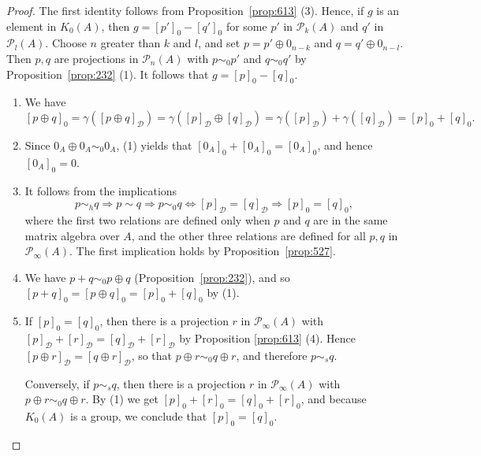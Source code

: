 \documentclass{book}
\begin{document}
\begin{proof}
  The first identity follows from Proposition~\ref{prop:613} (3). Hence, if \(g\) is an element
  in \(K_0(A)\), then \(g={[p']}_0-{[q']}_0\) for some \(p'\) in \(\mathcal{P}_k(A)\) and \(q'\) in \(\mathcal{P}_l(A)\).
  Choose \(n\) greater than \(k\) and \(l\), and set \(p=p'\oplus 0_{n-k}\) and \(q=q'\oplus 0_{n-l}\).
  Then \(p, q\) are projections in \(\mathcal{P}_n(A)\) with \(p\sim_0 p'\) and \(q\sim_0 q'\) by Proposition~\ref{prop:232} (1).
  It follows that \(g={[p]}_0-{[q]}_0\).
  \begin{enumerate}
    \item We have
    \[
      {[p\oplus q]}_0=\gamma({[p\oplus q]}_\mathcal{D})=\gamma({[p]}_\mathcal{D}\oplus {[q]}_\mathcal{D})=\gamma({[p]}_\mathcal{D})+ \gamma({[q]}_\mathcal{D})={[p]}_0+{[q]}_0.
    \]
    \item Since \(0_A\oplus 0_A\sim_0 0_A\), (1) yields that \({[0_A]}_0+{[0_A]}_0={[0_A]}_0\), and hence \({[0_A]}_0=0\).
    \item It follows from the implications
    \[
      p\sim_h q\Rightarrow p\sim q\Rightarrow p\sim_0 q \Leftrightarrow {[p]}_\mathcal{D}={[q]}_\mathcal{D}\Rightarrow {[p]}_0={[q]}_0,
    \]
    where the first two relations are defined only when \(p\) and \(q\) are in the same matrix algebra over \(A\), and the other three relations are defined for all \(p, q\) in \(\mathcal{P}_\infty(A)\). 
    The first implication holds by Proposition~\ref{prop:527}.
    \item We have \(p+q\sim_0 p\oplus q\) (Proposition~\ref{prop:232}), and so \({[p+q]}_0={[p\oplus q]}_0={[p]}_0+{[q]}_0\) by (1).
    \item If \({[p]}_0={[q]}_0\), then there is a projection \(r\) in \(\mathcal{P}_\infty(A)\) with \({[p]}_\mathcal{D}+{[r]}_\mathcal{D}={[q]}_\mathcal{D}+{[r]}_\mathcal{D}\) by Proposition \ref{prop:613} (4).
    Hence \({[p\oplus r]}_\mathcal{D}={[q\oplus r]}_\mathcal{D}\), so that \(p\oplus r\sim_0 q\oplus r\), and therefore \(p\sim_s q\).\par
    Conversely, if \(p\sim_s q\), then there is a projection \(r\) in \(\mathcal{P}_\infty(A)\) with \(p\oplus r\sim_0 q\oplus r\).
    By (1) we get \({[p]}_0+{[r]}_0={[q]}_0+{[r]}_0\), and because \(K_0(A)\) is a group, we conclude that \({[p]}_0={[q]}_0\).
  \end{enumerate}
\end{proof}
\end{document}
